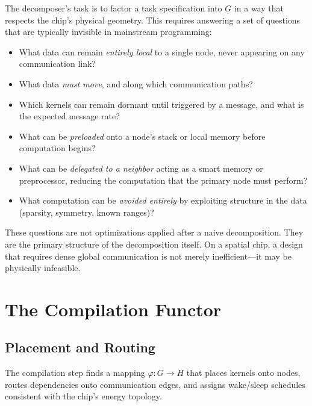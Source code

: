 \documentclass[11pt, a4paper]{article}
\begin{document}
The decomposer's task is to factor a task specification into $G$ in a way that respects
the chip's physical geometry. This requires answering a set of questions that are typically
invisible in mainstream programming:

\begin{itemize}
  \item What data can remain \emph{entirely local} to a single node, never appearing on
        any communication link?
  \item What data \emph{must move}, and along which communication paths?
  \item Which kernels can remain dormant until triggered by a message, and what is the
        expected message rate?
  \item What can be \emph{preloaded} onto a node's stack or local memory before
        computation begins?
  \item What can be \emph{delegated to a neighbor} acting as a smart memory or
        preprocessor, reducing the computation that the primary node must perform?
  \item What computation can be \emph{avoided entirely} by exploiting structure in the
        data (sparsity, symmetry, known ranges)?
\end{itemize}

These questions are not optimizations applied after a naive decomposition. They are
the primary structure of the decomposition itself. On a spatial chip, a design that
requires dense global communication is not merely inefficient---it may be physically
infeasible.

\section{The Compilation Functor}

\subsection{Placement and Routing}

The compilation step finds a mapping $\varphi : G \to H$ that places kernels onto nodes,
routes dependencies onto communication edges, and assigns wake/sleep schedules consistent
with the chip's energy topology.
\end{document}
